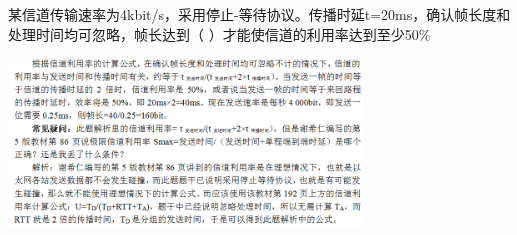 \question 某信道传输速率为4kbit/s，采用停止-等待协议。传播时延t=20ms，确认帧长度和处理时间均可忽略，帧长达到（
）才能使信道的利用率达到至少50\%
\par{}
\begin{solution}\includegraphics[width=3.70833in,height=1.76042in]{computerassets/4852416235FE9EA14F68B05403BF782C.png}
\end{solution}
